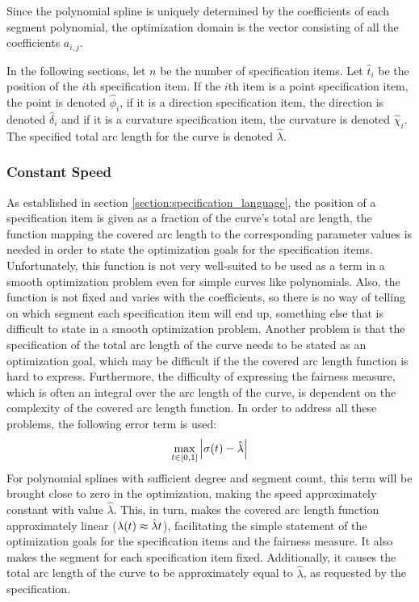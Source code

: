 \documentclass[a4paper]{article}
\begin{document}
				Since the polynomial spline is uniquely determined by the coefficients of each segment polynomial, the optimization domain is the vector consisting of all the coefficients \(a_{i,j}\).

				In the following sections, let \(n\) be the number of specification items. Let \(\hat{t}_i\) be the position of the \(i\)th specification item. If the \(i\)th item is a point specification item, the point is denoted \(\hat{\phi}_i\), if it is a direction specification item, the direction is denoted \(\hat{\delta}_i\) and if it is a curvature specification item, the curvature is denoted \(\hat{\chi}_i\). The specified total arc length for the curve is denoted \(\hat{\lambda}\).

			\subsubsection{Constant Speed}
			\label{section:constant_speed}

				As established in section \ref{section:specification_language}, the position of a specification item is given as a fraction of the curve's total arc length, the function mapping the covered arc length to the corresponding parameter values is needed in order to state the optimization goals for the specification items. Unfortunately, this function is not very well-suited to be used as a term in a smooth optimization problem even for simple curves like polynomials. Also, the function is not fixed and varies with the coefficients, so there is no way of telling on which segment each specification item will end up, something else that is difficult to state in a smooth optimization problem. Another problem is that the specification of the total arc length of the curve needs to be stated as an optimization goal, which may be difficult if the the covered arc length function is hard to express. Furthermore, the difficulty of expressing the fairness measure, which is often an integral over the arc length of the curve, is dependent on the complexity of the covered arc length function. In order to address all these problems, the following error term is used:
				\begin{equation*}
					\max_{t \in \left[ 0,1 \right]} \left| \sigma\!\left( t \right) - \hat{\lambda} \right|
				\end{equation*}
				For polynomial splines with sufficient degree and segment count, this term will be brought close to zero in the optimization, making the speed approximately constant with value \(\hat{\lambda}\). This, in turn, makes the covered arc length function approximately linear (\(\lambda\!\left( t \right) \approx \hat{\lambda}t\)), facilitating the simple statement of the optimization goals for the specification items and the fairness measure. It also makes the segment for each specification item fixed. Additionally, it causes the total arc length of the curve to be approximately equal to \(\hat{\lambda}\), as requested by the specification.
\end{document}
